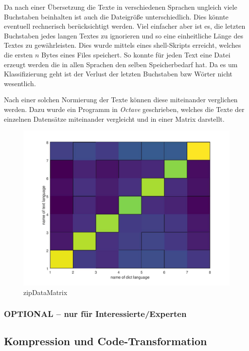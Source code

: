 \documentclass[12pt,german]{article}
\begin{document}
Da nach einer Übersetzung die Texte in verschiedenen Sprachen ungleich viele Buchstaben beinhalten ist auch die Dateigröße unterschiedlich. Dies könnte eventuell rechnerisch berücksichtigt werden. Viel einfacher aber ist es, die letzten Buchstaben jedes langen Textes zu ignorieren und so eine einheitliche Länge des Textes zu gewährleisten. Dies wurde mittels eines shell-Skripts erreicht, welches die ersten $n$ Bytes eines Files speichert. So konnte für jeden Text eine Datei erzeugt werden die in allen Sprachen den selben Speicherbedarf hat. Da es um Klassifizierung geht ist der Verlust der letzten Buchstaben bzw Wörter nicht wesentlich. 



Nach einer solchen Normierung der Texte können diese miteinander verglichen werden. Dazu wurde ein Programm in \textit{Octave} geschrieben, welches die Texte der einzelnen Datensätze miteinander vergleicht und in einer Matrix darstellt. 


\begin{figure}[H]
	\centering
	\includegraphics[width=12cm]{images/resultZipData.jpg}
	\caption{zipDataMatrix}
	\label{fig: zipDataMatrix}
\end{figure}



\subsubsection{OPTIONAL – nur für Interessierte/Experten}


\subsection{Kompression und Code-Transformation}
\end{document}
